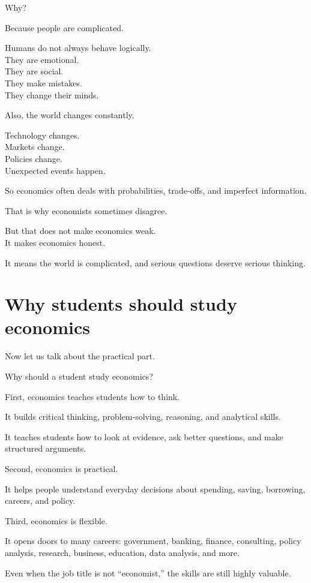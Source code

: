 \documentclass[12pt]{article}
\begin{document}
Why?

Because people are complicated.

Humans do not always behave logically.\\
They are emotional.\\
They are social.\\
They make mistakes.\\
They change their minds.

Also, the world changes constantly.

Technology changes.\\
Markets change.\\
Policies change.\\
Unexpected events happen.

So economics often deals with probabilities, trade-offs, and imperfect information.

That is why economists sometimes disagree.

But that does not make economics weak.\\
It makes economics honest.

It means the world is complicated, and serious questions deserve serious thinking.

\section*{Why students should study economics}

Now let us talk about the practical part.

Why should a student study economics?

First, economics teaches students how to think.

It builds critical thinking, problem-solving, reasoning, and analytical skills.

It teaches students how to look at evidence, ask better questions, and make structured arguments.

Second, economics is practical.

It helps people understand everyday decisions about spending, saving, borrowing, careers, and policy.

Third, economics is flexible.

It opens doors to many careers:
government, banking, finance, consulting, policy analysis, research, business, education, data analysis, and more.

Even when the job title is not “economist,” the skills are still highly valuable.
\end{document}
